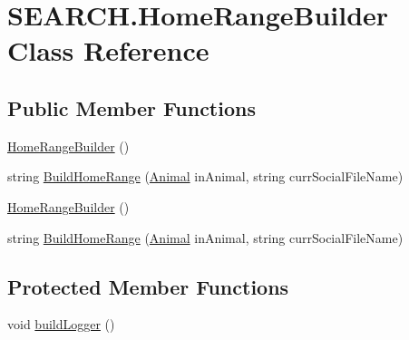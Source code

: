 \hypertarget{class_s_e_a_r_c_h_1_1_home_range_builder}{\section{S\-E\-A\-R\-C\-H.\-Home\-Range\-Builder Class Reference}
\label{class_s_e_a_r_c_h_1_1_home_range_builder}
}
\subsection*{Public Member Functions}
\begin{DoxyCompactItemize}
\item 
\hyperlink{class_s_e_a_r_c_h_1_1_home_range_builder_acc105cd596b2666478feb833e3cdaf8b}{Home\-Range\-Builder} ()
\item 
string \hyperlink{class_s_e_a_r_c_h_1_1_home_range_builder_a7d69336bf448adac52c721ce4c4fe86a}{Build\-Home\-Range} (\hyperlink{class_s_e_a_r_c_h_1_1_animal}{Animal} in\-Animal, string curr\-Social\-File\-Name)
\item 
\hyperlink{class_s_e_a_r_c_h_1_1_home_range_builder_acc105cd596b2666478feb833e3cdaf8b}{Home\-Range\-Builder} ()
\item 
string \hyperlink{class_s_e_a_r_c_h_1_1_home_range_builder_a7d69336bf448adac52c721ce4c4fe86a}{Build\-Home\-Range} (\hyperlink{class_s_e_a_r_c_h_1_1_animal}{Animal} in\-Animal, string curr\-Social\-File\-Name)
\end{DoxyCompactItemize}
\subsection*{Protected Member Functions}
\begin{DoxyCompactItemize}
\item 
void \hyperlink{class_s_e_a_r_c_h_1_1_home_range_builder_aaa3349ebafa6edf2faffe128bdecc03b}{build\-Logger} ()
\end{DoxyCompactItemize}


